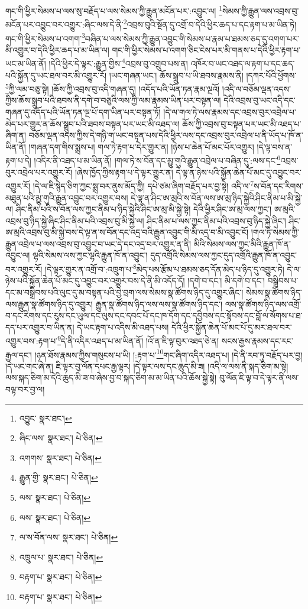 གང་གི་ཕྱིར་སེམས་པ་ལས་སུ་བརྗོད་པ་ལས་སེམས་ཀྱི་རྒྱུན་མངོན་པར་:འབྱུང་ལ། \footnote{འབྱུང་  སྣར་ཐང་། }སེམས་ཀྱི་རྒྱུན་ལས་འབྲས་བུ་མངོན་པར་འབྱུང་བར་འགྱུར་:ཞིང་ལས་དེ་ནི་\footnote{ཞིང་ལས་  སྣར་ཐང་།  པེ་ཅིན། }འབྲས་བུའི་སྔོན་དུ་འགྲོ་བ་དེའི་ཕྱིར་ཆད་པ་དང་རྟག་པ་མ་ཡིན་ཏེ། གང་གི་ཕྱིར་སེམས་པ་འགག་\footnote{འགགས་  སྣར་ཐང་།  པེ་ཅིན། }བཞིན་པ་ལས་སེམས་ཀྱི་རྒྱུན་འབྱུང་གི་སེམས་པ་རྣམ་པ་ཐམས་ཅད་དུ་འགག་པར་མི་འགྱུར་བ་དེའི་ཕྱིར་ཆད་པ་མ་ཡིན་ལ། གང་གི་ཕྱིར་སེམས་པ་འགག་ཅིང་ངེས་པར་མི་གནས་པ་དེའི་ཕྱིར་རྟག་པ་ཡང་མ་ཡིན་ནོ། །དེའི་ཕྱིར་དེ་ལྟར་:རྒྱུན་གྱིས་\footnote{རྒྱུན་གྱི་  སྣར་ཐང་།  པེ་ཅིན། }འབྲས་བུ་འགྲུབ་པས་ན། འཁོར་བ་ཡང་འཐད་ལ་རྟག་པ་དང་ཆད་པའི་སྐྱོན་དུ་ཡང་ཐལ་བར་མི་འགྱུར་རོ། །ཡང་གཞན་ཡང་། ཆོས་སྒྲུབ་པ་ཡི་ཐབས་རྣམས་ནི། །དཀར་པོའི་ཕྱོགས་\footnote{ལས་  སྣར་ཐང་།  པེ་ཅིན། }ཀྱི་ལམ་བཅུ་སྟེ། །ཆོས་ཀྱི་འབྲས་བུ་འདི་གཞན་དུ། །འདོད་པའི་ཡོན་ཏན་རྣམ་ལྔའོ། །འདི་ལ་བཅོམ་ལྡན་འདས་ཀྱིས་ཆོས་སྒྲུབ་པའི་ཐབས་ནི་དགེ་བ་བཅུའི་ལས་ཀྱི་ལམ་རྣམས་ཡིན་པར་བསྟན་ལ། དེའི་འབྲས་བུ་ཡང་འདི་དང་གཞན་དུ་འདོད་པའི་ཡོན་ཏན་ལྔ་པོ་དག་ཡིན་པར་བསྟན་ཏོ། །དེ་ལ་གལ་ཏེ་ལས་རྣམས་དང་འབྲས་བུར་འབྲེལ་པ་མེད་པར་གྱུར་ན་ཆོས་སྒྲུབ་པའི་ཐབས་བསྟན་པར་ཡང་མི་འཐད་ལ། ཆོས་ཀྱི་འབྲས་བུ་བསྟན་པར་ཡང་མི་འཐད་པ་ཞིག་ན། བཅོམ་ལྡན་འདས་ཀྱིས་དེ་གཉི་ག་ཡང་བསྟན་པས་དེའི་ཕྱིར་ལས་དང་འབྲས་བུར་འབྲེལ་པ་ནི་ཡོད་པ་ཁོ་ན་ཡིན་ནོ། །གཞན་དག་གིས་སྨྲས་པ། གལ་ཏེ་རྟག་པ་དེར་གྱུར་ན། །ཉེས་པ་ཆེན་པོ་མང་པོར་འགྱུར། །དེ་ལྟ་བས་ན་རྟག་པ་དེ། །འདིར་ནི་འཐད་པ་མ་ཡིན་ནོ། །གལ་ཏེ་ས་བོན་དང་མྱུ་གུའི་རྒྱུན་འབྲེལ་པ་བཞིན་དུ་:ལས་དང་\footnote{ལས་  སྣར་ཐང་།  པེ་ཅིན། }འབྲས་བུར་འབྲེལ་པར་འགྱུར་རོ། །ཞེས་ཁྱོད་ཀྱིས་རྟག་པ་དེ་ལྟར་གྱུར་ན། དེ་ལྟ་ན་ཉེས་པའི་སྐྱོན་ཆེན་པོ་མང་དུ་འབྱུང་བར་འགྱུར་རོ། །དེ་ལ་ཇི་སྙེད་ཅིག་ཀྱང་སྨྲ་བར་ནུས་མོད་ཀྱི། དཔེ་ཙམ་ཞིག་བརྗོད་པར་བྱ་སྟེ། འདི་ལ་\footnote{ལ་ས་བོན་ལས་  སྣར་ཐང་།  པེ་ཅིན། }ས་བོན་དང་རིགས་མཐུན་པའི་མྱུ་གུའི་རྒྱུན་འབྱུང་བར་འགྱུར་བས། དེ་ལྟ་ན་ཤིང་ཨ་མྲའི་ས་བོན་ལས་ཨ་མྲ་ཉིད་སྐྱེའི་ཤིང་ནིམ་པ་མི་སྐྱེ་ལ། ཤིང་ནིམ་པའི་ས་བོན་ལས་ཀྱང་ནིམ་པ་ཉིད་སྐྱེའི་ཤིང་ཨ་མྲ་མི་སྐྱེ་སྟེ། དེའི་ཕྱིར་ཤིང་ཨ་མྲ་ལས་ཀྱང་། ཨ་མྲའི་འབྲས་བུ་ཉིད་སྐྱེ་ཞིང་ཤིང་ནིམ་པའི་འབྲས་བུ་མི་སྐྱེ་ལ། ཤིང་ནིམ་པ་ལས་ཀྱང་ནིམ་པའི་འབྲས་བུ་ཉིད་སྐྱེ་ཞིང་། ཤིང་ཨ་མྲའི་འབྲས་བུ་མི་སྐྱེ་བས་དེ་ལྟ་ན་ས་བོན་དང་འདྲ་བའི་རྒྱུན་འབྱུང་གི་མི་འདྲ་བ་མི་འབྱུང་ངོ། །གལ་ཏེ་སེམས་ཀྱི་རྒྱུན་འབྲེལ་པ་ལས་འབྲས་བུ་འབྱུང་བ་ཡང་དེ་དང་འདྲ་བར་འགྱུར་ན་ནི། མིའི་སེམས་ལས་ཀྱང་མིའི་རྒྱུན་ཁོ་ན་འབྱུང་ལ། ལྷའི་སེམས་ལས་ཀྱང་ལྷའི་རྒྱུན་ཁོ་ན་འབྱུང་། དུད་འགྲོའི་སེམས་ལས་ཀྱང་དུད་འགྲོའི་རྒྱུན་ཁོ་ན་འབྱུང་བར་འགྱུར་རོ། །དེ་ལྟར་གྱུར་ན་འགྲོ་བ་:འཁྲུག་པ་\footnote{འཁྲུལ་པ་  སྣར་ཐང་།  པེ་ཅིན། }མེད་པས་རྩོམ་པ་ཐམས་ཅད་དོན་མེད་པ་ཉིད་དུ་འགྱུར་ཏེ། དེ་ལ་ཉེས་པའི་སྐྱོན་ཆེན་པོ་མང་དུ་འབྱུང་བར་འགྱུར་བས་དེ་ནི་མི་འདོད་དོ། །དགེ་བ་དང་། མི་དགེ་བ་དང་། བསྒྲིབས་པ་དང་མ་བསྒྲིབས་པའི་ལུང་དུ་མ་བསྟན་པའི་བྱེ་བྲག་ལས་སེམས་སྣ་ཚོགས་ཉིད་དུ་འགྱུར་ཞིང་། སེམས་སྣ་ཚོགས་ཉིད་ལས་རྒྱུན་སྣ་ཚོགས་ཉིད་དུ་འགྱུར། རྒྱུན་སྣ་ཚོགས་ཉིད་ལས་ལས་སྣ་ཚོགས་ཉིད་དང་། ལས་སྣ་ཚོགས་ཉིད་ལས་འགྲོ་བ་དང་རིགས་དང་རུས་དང་ཡུལ་དང་ལུས་དང་དབང་པོ་དང་ཁ་དོག་དང་དབྱིབས་དང་སྟོབས་དང་བློ་ལ་སོགས་པ་ཐ་དད་པར་འགྱུར་བ་ཡིན་ན། དེ་ཡང་རྟག་པ་འདིས་མི་འཐད་པས། དེའི་ཕྱིར་སྐྱོན་ཆེན་པོ་མང་པོ་དུ་མར་ཐལ་བར་འགྱུར་བས་:རྟག་པ་\footnote{བརྟག་པ་  སྣར་ཐང་།  པེ་ཅིན། }དེ་ནི་འདིར་འཐད་པ་མ་ཡིན་ནོ། །འོ་ན་ཇི་ལྟ་བུར་འཐད་ཅེ་ན། སངས་རྒྱས་རྣམས་དང་རང་རྒྱལ་དང་། །ཉན་ཐོས་རྣམས་ཀྱིས་གསུངས་པ་ཡི། །:རྟག་པ་\footnote{བརྟག་པ་  སྣར་ཐང་།  པེ་ཅིན། }གང་ཞིག་འདིར་འཐད་པ། །དེ་ནི་རབ་ཏུ་བརྗོད་པར་བྱ། །དེ་ཡང་གང་ཞེ་ན། ཇི་ལྟར་བུ་ལོན་དཔང་རྒྱ་ལྟར། །དེ་ལྟར་ལས་དང་ཆུད་མི་ཟ། །འདི་ལ་ལས་ནི་སྐད་ཅིག་མ་སྟེ། ལས་སྐད་ཅིག་མ་དེའི་ཆུད་མི་ཟ་བ་ཞེས་བྱ་བ་སྐད་ཅིག་མ་མ་ཡིན་པའི་ཆོས་སྐྱེ་སྟེ། བུ་ལོན་ཇི་ལྟ་བ་དེ་ལྟར་ནི་ལས་བལྟ་བར་བྱ་ལ། 